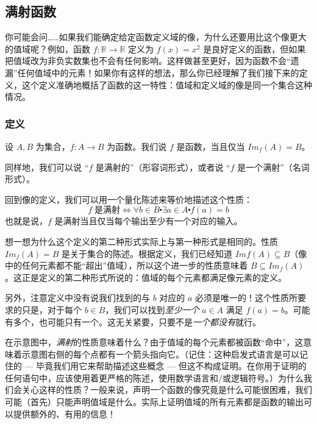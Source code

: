 
\subsection{满射函数}

你可能会问……如果我们能确定给定函数定义域的像，为什么还要用比这个像更大的值域呢？例如，函数 $f : \mathbb{R} \to \mathbb{R}$ 定义为 $f(x) = x^2$ 是良好定义的函数，但如果把值域改为非负实数集也不会有任何影响。这样做甚至更好，因为函数不会``遗漏''任何值域中的元素！如果你有这样的想法，那么你已经理解了我们接下来的定义，这个定义准确地概括了函数的这一特性：值域和定义域的像是同一个集合这种情况。

\subsubsection*{定义}

\begin{definition}
    设 $A,B$ 为集合，$f:A \to B$ 为函数。我们说 $f$ 是函数，当且仅当 $Im_f (A) = B$。

    同样地，我们可以说 ``$f$ 是满射的''（形容词形式），或者说 ``$f$ 是一个满射''（名词形式）。

    回到像的定义，我们可以用一个量化陈述来等价地描述这个性质：
    \[f \;\text{是满射} \iff \forall b \in B \centerdot \exists a \in A \centerdot f(a) = b\]
    也就是说，$f$ 是满射当且仅当每个输出至少有一个对应的输入。
\end{definition}

想一想为什么这个定义的第二种形式实际上与第一种形式是相同的。性质 $Im_f (A) = B$ 是关于集合的陈述。根据定义，我们已经知道 $Imf (A) \subseteq B$（像中的任何元素都不能``超出''值域），所以这个进一步的性质意味着 $B \subseteq Im_f (A)$。这正是定义的第二种形式所说的：值域的每个元素都满足像元素的定义。

另外，注意定义中没有说我们找到的与 $b$ 对应的 $a$ 必须是唯一的！这个性质所要求的只是，对于每个 $b \in B$，我们可以找到\emph{至少一个} $a \in A$ 满足 $f(a) = b$。可能有多个，也可能只有一个。这无关紧要，只要不是\emph{一个都没有}就行。

在示意图中，\emph{满射}的性质意味着什么？由于值域的每个元素都被函数``命中''，这意味着示意图右侧的每个点都有一个箭头指向它。（记住：这种启发式语言是可以记住的 --- 毕竟我们用它来帮助描述这些概念 --- 但这不构成证明。在你用于证明的任何语句中，应该使用着更严格的陈述，使用数学语言和/或逻辑符号。）为什么我们会关心这样的性质？一般来说，声明一个函数的像究竟是什么可能很困难，我们可能（首先）只能声明值域是什么。实际上证明值域的所有元素都是函数的输出可以提供额外的、有用的信息！


